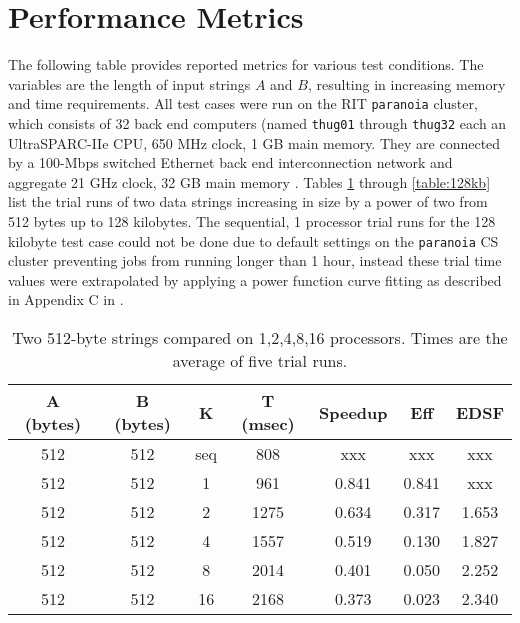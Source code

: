 \section{Performance Metrics}
\label{sec:metrics}
The following table provides reported metrics for various test conditions. The variables are the length of input strings $A$ and $B$, resulting in increasing memory and time requirements. All test cases were run on the RIT {\tt paranoia} cluster, which consists of 32 back end computers (named {\tt thug01} through {\tt thug32} each an UltraSPARC-IIe CPU, 650 MHz clock, 1 GB main memory. They are connected by a 100-Mbps switched Ethernet back end interconnection network and aggregate 21 GHz clock, 32 GB main memory \cite{running-pj}. Tables \ref{table:512b} through \ref{table:128kb} list the trial runs of two data strings increasing in size by a power of two from 512 bytes up to 128 kilobytes. The sequential, 1 processor trial runs for the 128 kilobyte test case could not be done due to default settings on the {\tt paranoia} CS cluster preventing jobs from running longer than 1 hour, instead these trial time values were extrapolated by applying a power function curve fitting as described in Appendix C in \cite{Kaminsky:2009p2048}.

\begin{table}[h]
	\begin{center}
		\begin{tabular}{ | c | c | c | c | c | c | c |}
			\hline
			A (bytes)&	B (bytes) &	K	&	T (msec)	&	Speedup	&	Eff	&	EDSF \\
			\hline																	 
			512     &	512     &	seq	&808  &	xxx		&	xxx	&	xxx  \\
			512     &	512     &	1	&961  &0.841&0.841&	xxx \\
			512     &	512     &	2	&1275 &0.634&0.317&1.653\\
			512     &	512     &	4	&1557 &0.519&0.130&1.827\\
			512     &	512     &	8	&2014 &0.401&0.050&2.252\\
			512     &	512     &	16	&2168 &0.373&0.023&2.340\\
			\hline
		\end{tabular}
	\end{center}
	\caption{Two 512-byte strings compared on {1,2,4,8,16} processors. Times are the average of five trial runs.}
	\label{table:512b}
\end{table}

